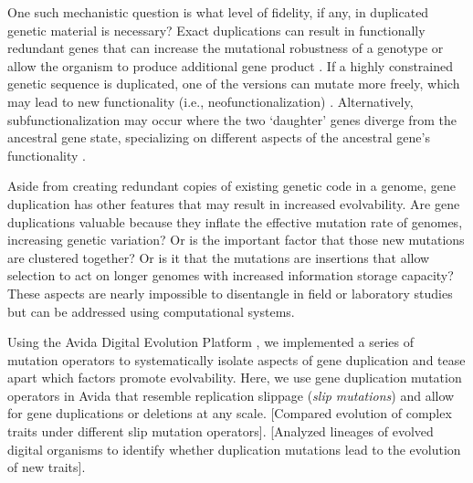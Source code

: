 One such mechanistic question is what level of fidelity, if any, in duplicated genetic material is necessary?
Exact duplications can result in functionally redundant genes that can increase the mutational robustness of a genotype \citep{Crow:2006role} or allow the organism to produce additional gene product \citep{Zhang:2003fw}.
If a highly constrained genetic sequence is duplicated, one of the versions can mutate more freely, which may lead to new functionality (i.e., neofunctionalization) \citep{Zhang:2003fw,Wagner:2003fk}.
Alternatively, subfunctionalization may occur where the two `daughter' genes diverge from the ancestral gene state, specializing on different aspects of the ancestral gene's functionality \citep{Zhang:2003fw}.

Aside from creating redundant copies of existing genetic code in a genome, gene duplication has other features that may result in increased evolvability.
Are gene duplications valuable because they inflate the effective mutation rate of genomes, increasing genetic variation?
Or is the important factor that those new mutations are clustered together?
Or is it that the mutations are insertions that allow selection to act on longer genomes with increased information storage capacity?
These aspects are nearly impossible to disentangle in field or laboratory studies but can be addressed using computational systems.

Using the Avida Digital Evolution Platform \citep{ofria2004avida}, we implemented a series of mutation operators to systematically isolate aspects of gene duplication and tease apart which factors promote evolvability.
Here, we use gene duplication mutation operators in Avida that resemble replication slippage \citep{bzymek_instability_2001} (\textit{slip mutations}) and allow for gene duplications or deletions at any scale.
[Compared evolution of complex traits under different slip mutation operators].
[Analyzed lineages of evolved digital organisms to identify whether duplication mutations lead to the evolution of new traits].

